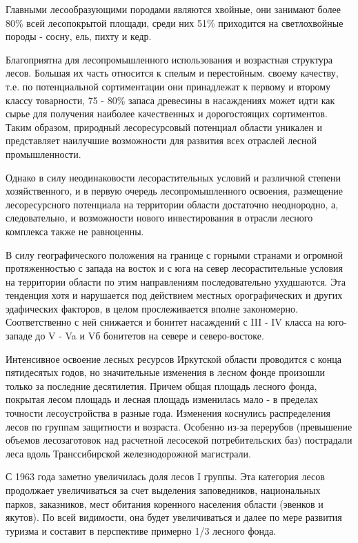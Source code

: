 \documentclass{report}
\begin{document}
Главными лесообразующими породами являются хвойные, они занимают более 80\% всей лесопокрытой площади, среди них 51\%
приходится на светлохвойные породы - сосну, ель, пихту и кедр.

Благоприятна для лесопромышленного использования и возрастная структура лесов. Большая их часть относится к спелым и
перестойным. своему качеству, т.е. по потенциальной сортиментации они принадлежат к первому и второму классу
товарности, 75 - 80\% запаса древесины в насаждениях может идти как сырье для получения наиболее качественных и
дорогостоящих сортиментов. Таким образом, природный лесоресурсовый потенциал области уникален и представляет наилучшие
возможности для развития всех отраслей лесной промышленности.

Однако в силу неодинаковости лесорастительных условий и различной степени хозяйственного, и в первую очередь
лесопромышленного освоения, размещение лесоресурсного потенциала на территории области достаточно неоднородно, а,
следовательно, и возможности нового инвестирования в отрасли лесного комплекса также не равноценны.

В силу географического положения на границе с горными странами и огромной протяженностью с запада на восток и с юга на
север лесорастительные условия на территории области по этим направлениям последовательно ухудшаются. Эта тенденция
хотя и нарушается под действием местных орографических и других эдафических факторов, в целом прослеживается вполне
закономерно. Соответственно с ней снижается и бонитет насаждений с III - IV класса на юго-западе до V - Va и Vб
бонитетов на севере и северо-востоке.

Интенсивное освоение  лесных ресурсов  Иркутской  области проводится с конца пятидесятых годов, но значительные
изменения в лесном фонде произошли только за последние десятилетия. Причем общая площадь лесного фонда, покрытая лесом
площадь и лесная площадь изменилась мало - в пределах точности лесоустройства в разные года. Изменения коснулись
распределения лесов по группам защитности и возраста. Особенно из-за перерубов (превышение объемов лесозаготовок над
расчетной лесосекой потребительских баз) пострадали леса вдоль Транссибирской железнодорожной магистрали.

С 1963 года заметно увеличилась доля лесов I группы. Эта категория лесов продолжает увеличиваться за счет выделения
заповедников, национальных парков, заказников, мест обитания коренного населения области (эвенков и якутов). По  всей
видимости, она будет увеличиваться и далее по мере развития туризма и составит в перспективе примерно 1/3 лесного
фонда.
\end{document}
